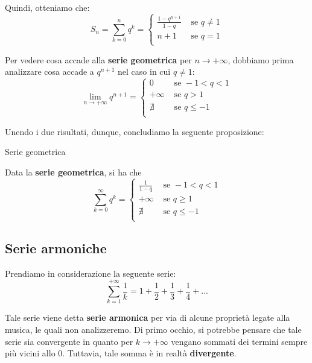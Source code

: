 \documentclass[a4paper, 12pt]{report}
\begin{document}
    Quindi, otteniamo che:
    $$
    S_n = \sum_{k = 0}^n q^k= \left \{ \begin{array}{ll}
            \frac{1 - q^{n+1}}{1-q} & \text{ se } q \neq 1\\
            n+1 & \text{ se } q = 1\\
        \end{array} \right .
    $$

    Per vedere cosa accade alla \textbf{serie geometrica} per $n \to +\infty$, dobbiamo prima analizzare cosa accade a $q^{n+1}$ nel caso in cui $q \neq 1$:
    $$
    \lim_{n \to +\infty} q^{n+1} = \left \{ \begin{array}{ll}
            0 & \text{ se } -1 < q < 1\\
            +\infty & \text{ se } q > 1\\
            \nexists & \text{ se } q \leq -1\\
        \end{array} \right .
    $$
    
    Unendo i due risultati, dunque, concludiamo la seguente proposizione:
    
    \begin{framedprop}{Serie geometrica}
    
        Data la \textbf{serie geometrica}, si ha che
        $$
        \sum_{k = 0}^{\infty} q^k  = \left \{ \begin{array}{ll}
                \frac{1}{1-q} & \text{ se } -1 < q < 1\\
                +\infty & \text{ se } q \geq 1\\
                \nexists & \text{ se } q \leq -1\\
            \end{array} \right .
        $$
    \end{framedprop}
        
    \quad

    \subsection{Serie armoniche}
    
    Prendiamo in considerazione la seguente serie:
    \[ \sum_{k=1}^{+\infty} \frac{1}{k} = 1 + \frac{1}{2} +\frac{1}{3} +\frac{1}{4} + ...\]

    Tale serie viene detta \textbf{serie armonica} per via di alcune proprietà legate alla musica, le quali non analizzeremo. Di primo occhio, si potrebbe pensare che tale serie sia convergente in quanto per $k \to +\infty$ vengano sommati dei termini sempre più vicini allo 0. Tuttavia, tale somma è in realtà \textbf{divergente}.
\end{document}
